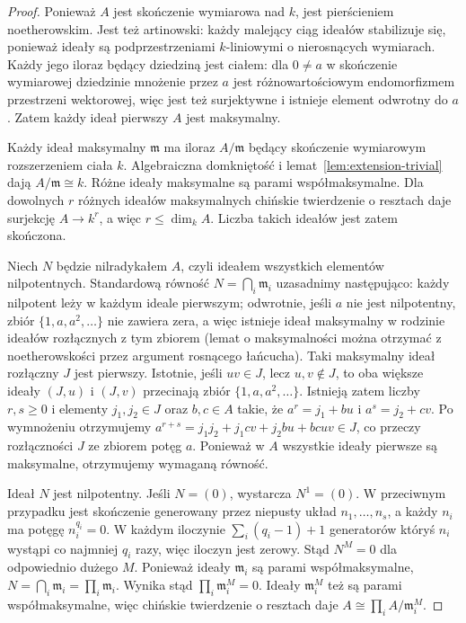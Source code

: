 \documentclass[11pt,a4paper,openany]{report}
\numberwithin{equation}{section}
\theoremstyle{plain}
\theoremstyle{definition}
\theoremstyle{remark}
\begin{document}
\begin{proof}
Ponieważ $A$ jest skończenie wymiarowa nad $k$, jest
pierścieniem noetherowskim. Jest też artinowski:
każdy malejący ciąg ideałów stabilizuje się, ponieważ
ideały są podprzestrzeniami $k$-liniowymi o nierosnących
wymiarach. Każdy jego iloraz będący dziedziną jest ciałem:
dla $0\ne a$ w skończenie wymiarowej dziedzinie
mnożenie przez $a$ jest różnowartościowym endomorfizmem
przestrzeni wektorowej, więc jest też surjektywne
i istnieje element odwrotny do $a$.
Zatem każdy ideał pierwszy $A$ jest maksymalny.

Każdy ideał maksymalny $\mathfrak m$ ma iloraz $A/\mathfrak m$
będący skończenie wymiarowym rozszerzeniem ciała $k$.
Algebraiczna domkniętość i lemat~\ref{lem:extension-trivial}
dają $A/\mathfrak m\cong k$.
Różne ideały maksymalne są parami współmaksymalne.
Dla dowolnych $r$ różnych ideałów maksymalnych chińskie
twierdzenie o resztach daje surjekcję $A\to k^r$,
a więc $r\le\dim_k A$. Liczba takich ideałów jest
zatem skończona.

Niech $N$ będzie nilradykałem $A$, czyli ideałem wszystkich
elementów nilpotentnych. Standardową równość
$N=\bigcap_i\mathfrak m_i$ uzasadnimy następująco:
każdy nilpotent leży w każdym ideale pierwszym;
odwrotnie, jeśli $a$ nie jest nilpotentny, zbiór
$\{1,a,a^2,\dots\}$ nie zawiera zera, a więc istnieje
ideał maksymalny w rodzinie ideałów rozłącznych z tym
zbiorem (lemat o maksymalności można otrzymać z
noetherowskości przez argument rosnącego łańcucha).
Taki maksymalny ideał rozłączny $J$ jest pierwszy.
Istotnie, jeśli $uv\in J$, lecz $u,v\notin J$, to oba
większe ideały $(J,u)$ i $(J,v)$ przecinają zbiór
$\{1,a,a^2,\dots\}$. Istnieją zatem liczby $r,s\ge0$
i elementy $j_1,j_2\in J$ oraz $b,c\in A$ takie, że
$a^r=j_1+bu$ i $a^s=j_2+cv$.
Po wymnożeniu otrzymujemy
$a^{r+s}=j_1j_2+j_1cv+j_2bu+bcuv\in J$,
co przeczy rozłączności $J$ ze zbiorem potęg $a$.
Ponieważ w $A$ wszystkie ideały pierwsze są maksymalne,
otrzymujemy wymaganą równość.

Ideał $N$ jest nilpotentny. Jeśli $N=(0)$, wystarcza
$N^1=(0)$. W przeciwnym przypadku jest skończenie
generowany przez niepusty układ $n_1,\dots,n_s$,
a każdy $n_i$ ma potęgę $n_i^{q_i}=0$.
W każdym iloczynie $\sum_i(q_i-1)+1$ generatorów
któryś $n_i$ wystąpi co najmniej $q_i$ razy,
więc iloczyn jest zerowy.
Stąd $N^M=0$ dla odpowiednio dużego $M$.
Ponieważ ideały $\mathfrak m_i$ są parami współmaksymalne,
$N=\bigcap_i\mathfrak m_i=\prod_i\mathfrak m_i$.
Wynika stąd $\prod_i\mathfrak m_i^M=0$.
Ideały $\mathfrak m_i^M$ też są parami współmaksymalne,
więc chińskie twierdzenie o resztach daje
$A\cong\prod_i A/\mathfrak m_i^M$.


\end{proof}
\end{document}
